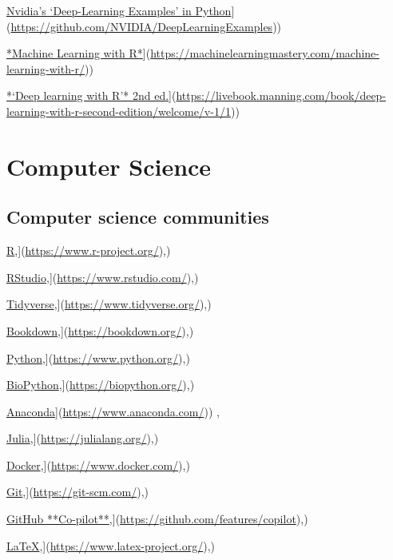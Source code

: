 \documentclass[
]{book}
\begin{document}
\href{\%5Bhttps://github.com/NVIDIA/DeepLearningExamples}{Nvidia's `Deep-Learning Examples' in Python}{]}(\url{https://github.com/NVIDIA/DeepLearningExamples}))

\href{\%5Bhttps://machinelearningmastery.com/machine-learning-with-r/}{*Machine Learning with R*}{]}(\url{https://machinelearningmastery.com/machine-learning-with-r/}))

\href{\%5Bhttps://livebook.manning.com/book/deep-learning-with-r-second-edition/welcome/v-1/1}{*`Deep learning with R'* 2nd ed.}{]}(\url{https://livebook.manning.com/book/deep-learning-with-r-second-edition/welcome/v-1/1}))

\chapter{Computer Science}\label{computer-science}

\section{Computer science communities}\label{computer-science-communities}

\href{\%5Bhttps://www.r-project.org/}{R},{]}(\url{https://www.r-project.org/}),)

\href{\%5Bhttps://www.rstudio.com/}{RStudio},{]}(\url{https://www.rstudio.com/}),)

\href{\%5Bhttps://www.tidyverse.org/}{Tidyverse},{]}(\url{https://www.tidyverse.org/}),)

\href{\%5Bhttps://bookdown.org/}{Bookdown},{]}(\url{https://bookdown.org/}),)

\href{\%5Bhttps://www.python.org/}{Python},{]}(\url{https://www.python.org/}),)

\href{\%5Bhttps://biopython.org/}{BioPython},{]}(\url{https://biopython.org/}),)

\href{\%5Bhttps://www.anaconda.com/}{Anaconda}{]}(\url{https://www.anaconda.com/})) ,

\href{\%5Bhttps://julialang.org/}{Julia},{]}(\url{https://julialang.org/}),)

\href{\%5Bhttps://www.docker.com/}{Docker},{]}(\url{https://www.docker.com/}),)

\href{\%5Bhttps://git-scm.com/}{Git},{]}(\url{https://git-scm.com/}),)

\href{\%5Bhttps://github.com/features/copilot}{GitHub **Co-pilot**},{]}(\url{https://github.com/features/copilot}),)

\href{\%5Bhttps://www.latex-project.org/}{LaTeX},{]}(\url{https://www.latex-project.org/}),)
\end{document}

